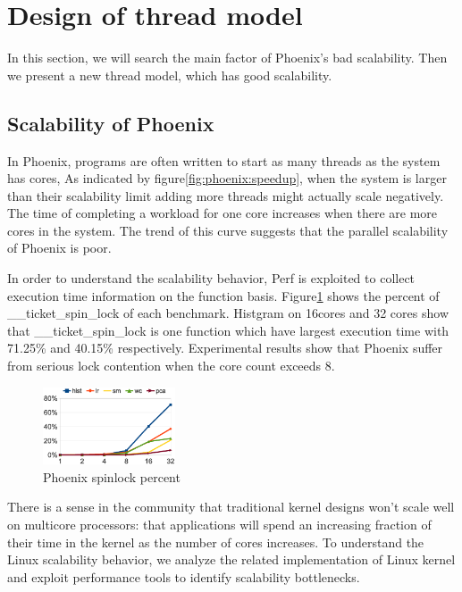 \section{Design of thread model}
{\color{red}In this section, we will search the main factor of Phoenix's bad scalability.
Then we present a new thread model, which has good scalability.
}

\subsection{Scalability of Phoenix}
In Phoenix, programs are often written to start as many threads as the system has cores,
As indicated by figure\ref{fig:phoenix:speedup}, 
when the system is larger than their scalability limit 
adding more threads might actually scale negatively.
The time of completing a workload for one core increases 
when there are more cores in the system. 
The trend of this curve suggests that
the parallel scalability of Phoenix is poor.

In order to understand the scalability behavior, 
Perf\cite{} is exploited to collect execution time information
on the function basis. 
Figure\ref{fig:phoenix:spinlock} shows the percent of \_\_ticket\_spin\_lock of each benchmark.
Histgram on 16cores and 32 cores
show that \_\_ticket\_spin\_lock is one function 
which have largest execution time with 71.25\% and 40.15\% respectively. 
Experimental results show that Phoenix suffer from serious lock contention
when the core count exceeds 8.
\begin{figure}[!h!t]  
    \centering
    \includegraphics[width=0.35\textwidth]{eps/phoenix_spinlock.eps}
    \caption{Phoenix spinlock percent}
    \label{fig:phoenix:spinlock}
\end{figure}


There is a sense in the community that traditional kernel
designs won’t scale well on multicore processors: that
applications will spend an increasing fraction of their time
in the kernel as the number of cores increases.
To understand the Linux scalability
behavior, we analyze the related implementation of Linux
kernel and exploit performance tools to identify scalability
bottlenecks.

